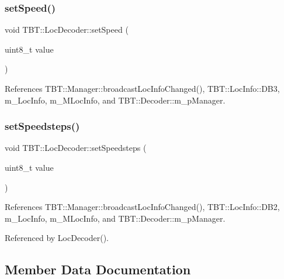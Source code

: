 \subsubsection{\texorpdfstring{set\+Speed()}{setSpeed()}}
{\footnotesize\ttfamily void T\+B\+T\+::\+Loc\+Decoder\+::set\+Speed (\begin{DoxyParamCaption}\item[{uint8\+\_\+t}]{value }\end{DoxyParamCaption})\hspace{0.3cm}{\ttfamily [inline]}}



References T\+B\+T\+::\+Manager\+::broadcast\+Loc\+Info\+Changed(), T\+B\+T\+::\+Loc\+Info\+::\+D\+B3, m\+\_\+\+Loc\+Info, m\+\_\+\+M\+Loc\+Info, and T\+B\+T\+::\+Decoder\+::m\+\_\+p\+Manager.

\mbox{\label{classTBT_1_1LocDecoder_aa919a313cb33a49d792694a544f2d3de_aa919a313cb33a49d792694a544f2d3de}} 
\subsubsection{\texorpdfstring{set\+Speedsteps()}{setSpeedsteps()}}
{\footnotesize\ttfamily void T\+B\+T\+::\+Loc\+Decoder\+::set\+Speedsteps (\begin{DoxyParamCaption}\item[{uint8\+\_\+t}]{value }\end{DoxyParamCaption})\hspace{0.3cm}{\ttfamily [inline]}}



References T\+B\+T\+::\+Manager\+::broadcast\+Loc\+Info\+Changed(), T\+B\+T\+::\+Loc\+Info\+::\+D\+B2, m\+\_\+\+Loc\+Info, m\+\_\+\+M\+Loc\+Info, and T\+B\+T\+::\+Decoder\+::m\+\_\+p\+Manager.



Referenced by Loc\+Decoder().



\subsection{Member Data Documentation}
\mbox{\label{classTBT_1_1LocDecoder_adc6e09d951be66f20bf3e7ac57f9fde2_adc6e09d951be66f20bf3e7ac57f9fde2}} 
